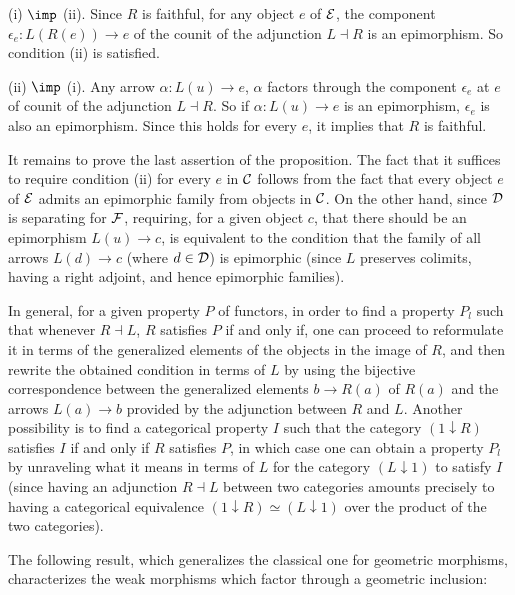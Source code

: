 \documentclass[a4paper,12pt]{article}
\begin{document}
\begin{proofs}
	(i) $\imp$ (ii). Since $R$ is faithful, for any object $e$ of $\cal E$, the component $\epsilon_{e}:L(R(e))\to e$ of the counit of the adjunction $L\dashv R$ is an epimorphism. So condition (ii) is satisfied.
	
	(ii) $\imp$ (i). Any arrow $\alpha:L(u)\to e$, $\alpha$ factors through the component $\epsilon_{e}$ at $e$ of counit of the adjunction $L\dashv R$. So if $\alpha:L(u)\to e$ is an epimorphism, $\epsilon_{e}$ is also an epimorphism. Since this holds for every $e$, it implies that $R$ is faithful.
	
	It remains to prove the last assertion of the proposition. The fact that it suffices to require condition (ii) for every $e$ in $\cal C$ follows from the fact that every object $e$ of $\cal E$ admits an epimorphic family from objects in $\cal C$. On the other hand, since $\cal D$ is separating for $\cal F$, requiring, for a given object $c$, that there should be an epimorphism $L(u)\to c$, is equivalent to the condition that the family of all arrows $L(d)\to c$ (where $d\in {\cal D}$) is epimorphic (since $L$ preserves colimits, having a right adjoint, and hence epimorphic families).     	
\end{proofs}

\begin{remark}
	In general, for a given property $P$ of functors, in order to find a property $P_{l}$ such that whenever $R\dashv L$, $R$ satisfies $P$ if and only if, one can proceed to reformulate it in terms of the generalized elements of the objects in the image of $R$, and then rewrite the obtained condition in terms of $L$ by using the bijective correspondence between the generalized elements $b\to R(a)$ of $R(a)$ and the arrows $L(a)\to b$ provided by the adjunction between $R$ and $L$. Another possibility is to find a categorical property $I$ such that the category $(1\downarrow R)$ satisfies $I$ if and only if $R$ satisfies $P$, in which case one can obtain a property $P_{l}$ by unraveling what it means in terms of $L$ for the category $(L\downarrow 1)$ to satisfy $I$ (since having an adjunction $R\dashv L$ between two categories amounts precisely to having a categorical equivalence $(1\downarrow R)\simeq (L\downarrow 1)$ over the product of the two categories).
\end{remark}


The following result, which generalizes the classical one for geometric morphisms, characterizes the weak morphisms which factor through a geometric inclusion:
\end{document}
